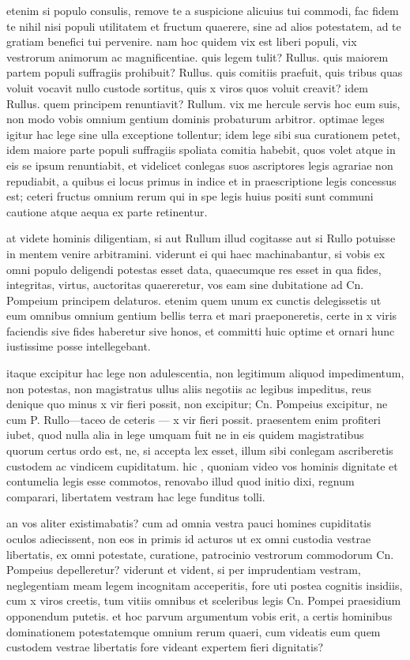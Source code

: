  etenim si populo consulis, remove te a suspicione alicuius tui commodi, fac fidem te nihil nisi populi utilitatem et fructum quaerere, sine ad alios potestatem, ad te gratiam benefici tui pervenire. nam hoc quidem vix est liberi populi, vix vestrorum animorum ac magnificentiae. quis legem tulit? Rullus. quis maiorem partem populi suffragiis prohibuit? Rullus. quis comitiis praefuit, quis tribus quas voluit vocavit nullo custode sortitus, quis x viros quos voluit creavit? idem Rullus. quem principem renuntiavit? Rullum. vix me hercule servis hoc eum suis, non modo vobis omnium gentium dominis probaturum arbitror. optimae leges igitur hac lege sine ulla exceptione tollentur; idem lege sibi sua curationem petet, idem maiore parte populi suffragiis spoliata comitia habebit, quos volet atque in eis se ipsum renuntiabit, et videlicet conlegas suos ascriptores legis agrariae non repudiabit, a quibus ei locus primus in indice et in praescriptione legis concessus est; ceteri fructus omnium rerum qui in spe legis huius positi sunt communi cautione atque aequa ex parte retinentur.

 at videte hominis diligentiam, si aut Rullum illud cogitasse aut si Rullo potuisse in mentem venire arbitramini. viderunt ei qui haec machinabantur, si vobis ex omni populo deligendi potestas esset data, quaecumque res esset in qua fides, integritas, virtus, auctoritas quaereretur, vos eam sine dubitatione ad Cn. Pompeium principem delaturos. etenim quem unum ex cunctis delegissetis ut eum omnibus omnium gentium bellis terra et mari praeponeretis, certe in x viris faciendis sive fides haberetur sive honos, et committi huic optime et ornari hunc iustissime posse intellegebant.

 itaque excipitur hac lege non adulescentia, non legitimum aliquod impedimentum, non potestas, non magistratus ullus aliis negotiis ac legibus impeditus, reus denique quo minus x vir fieri possit, non excipitur; Cn. Pompeius excipitur, ne cum P. Rullo—taceo de ceteris — x vir fieri possit. praesentem enim profiteri iubet, quod nulla alia in lege umquam fuit ne in eis quidem magistratibus quorum certus ordo est, ne, si accepta lex esset, illum sibi conlegam ascriberetis custodem ac vindicem cupiditatum. hic , quoniam video vos hominis dignitate et contumelia legis esse commotos, renovabo illud quod initio dixi, regnum comparari, libertatem vestram hac lege funditus tolli.

 an vos aliter existimabatis? cum ad omnia vestra pauci homines cupiditatis oculos adiecissent, non eos in primis id acturos ut ex omni custodia vestrae libertatis, ex omni potestate, curatione, patrocinio vestrorum commodorum Cn. Pompeius depelleretur? viderunt et vident, si per imprudentiam vestram, neglegentiam meam legem incognitam acceperitis, fore uti postea cognitis insidiis, cum x viros creetis, tum vitiis omnibus et sceleribus legis Cn. Pompei praesidium opponendum putetis. et hoc parvum argumentum vobis erit, a certis hominibus dominationem potestatemque omnium rerum quaeri, cum videatis eum quem custodem vestrae libertatis fore videant expertem fieri dignitatis?

